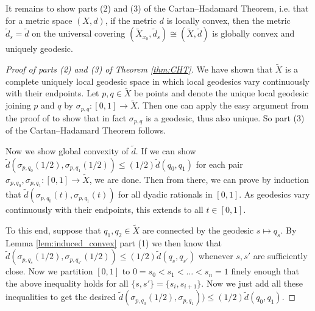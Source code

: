 \documentclass[11pt, a4paper, oneside]{memoir}
\theoremstyle{plain}\newtheorem{theorem}[subsection]{Theorem}
\theoremstyle{definition}
\newcommand{\twiddle}[1]{\widetilde{#1}}
\begin{document}
It remains to show parts (2) and (3) of the Cartan--Hadamard Theorem, i.e. that for a metric space \((X,d)\), if the metric \(d\) is locally convex, then the metric \(\twiddle{d}_s=\twiddle{d}\) on the universal covering \((\twiddle{X}_{x_0},\twiddle{d}_s) \cong (\twiddle{X},\twiddle{d})\) is globally convex and uniquely geodesic.
\begin{proof}[Proof of parts (2) and (3) of Theorem \ref{thm:CHT}]
We have shown that \(\twiddle{X}\) is a complete uniquely local geodesic space in which  local geodesics vary continuously with their endpoints.
Let \(p,q\in \twiddle{X}\) be points and denote the unique local geodesic joining \(p\) and \(q\) by \(\sigma_{p,q}:[0,1]\to \twiddle{X}\).  Then one can apply the easy argument from the proof of \cite[Lemma 4.8(1)]{BridHaef} to show that in fact $\sigma_{p,q}$ is a geodesic, thus also unique. So part (3) of the Cartan--Hadamard Theorem follows.

Now we show global convexity of $\twiddle{d}$.
If we can show \(\twiddle{d}(\sigma_{p,q_0}(1/2),\sigma_{p,q_1}(1/2))\leq (1/2)\twiddle{d}(q_0,q_1)\) for each pair \(\sigma_{p,q_0},\sigma_{p,q_1}:[0,1]\to \twiddle{X}\), we are done.
Then from there, we can prove by induction that \(\twiddle{d}(\sigma_{p,q_0}(t),\sigma_{p,q_1}(t))\) for all dyadic rationals in \([0,1]\). 
As geodesics vary continuously with their endpoints, this extends to all \(t\in [0,1]\).

To this end, suppose that \(q_1,q_2 \in \twiddle{X} \) are connected by the geodesic \(s\mapsto q_s\).
By Lemma \ref{lem:induced_convex} part (1) we then know that \(\twiddle{d}(\sigma_{p,q_s}(1/2),\sigma_{p,q_{s'}}(1/2))\leq (1/2)\twiddle{d}(q_s,q_{s'})\) whenever \(s,s'\) are sufficiently close.
Now we partition \([0,1]\) to \(0=s_0<s_1<\ldots<s_n=1\) finely enough that the above inequality holds for all \(\{s,s'\}=\{s_i,s_{i+1}\}\).
Now we just add all these inequalities to get the desired \(\twiddle{d}(\sigma_{p,q_0}(1/2),\sigma_{p,q_1}))\leq (1/2)\twiddle{d}(q_0,q_1)\).
\end{proof}
\end{document}
